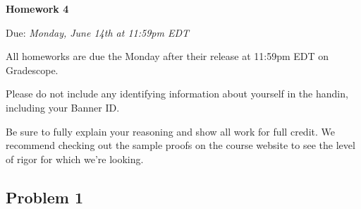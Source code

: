 \documentclass[12pt,letterpaper]{article}
\begin{document}
  \thispagestyle{firstpagestyle}
  \begin{center}
    {\huge \textbf{Homework 4}}

    {\large Due:\textit{ Monday, June 14th at 11:59pm EDT}}
  \end{center}


     All homeworks are due the Monday after their release at 11:59pm EDT on Gradescope.

    Please do not include any identifying information about yourself in the handin, including your Banner ID.

    Be sure to fully explain your reasoning and show all work for full credit. We recommend checking out the sample proofs on the course website to see the level of rigor for which we're looking.

\subsection*{Problem 1}
\end{document}
